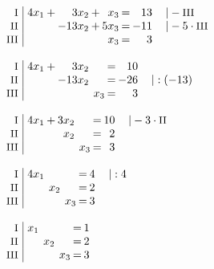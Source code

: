 \begin{equation*}
\begin{array}{l}
\begin{array}{r|rcrcrcrl}
\end{array}
\\ \\
\setlength{\arraycolsep}{1pt}
\begin{array}{r|rcrcrcrl}
    \text{\small I } &\; 4x_{1} & + &   3x_{2} & + &  x_{3} & = &  13 & \quad|-\text{\small III}       \\
   \text{\small II } &\;        &   & -13x_{2} & + & 5x_{3} & = & -11 & \quad|-5\cdot\text{\small III} \\
  \text{\small III } &\;        &   &          &   &  x_{3} & = &   3 &                                  
\end{array}
\\ \\
\setlength{\arraycolsep}{1pt}
\begin{array}{r|rcrcrcrl}
    \text{\small I } &\; 4x_{1} & + &   3x_{2} &  &       & = &  10 &              \\
   \text{\small II } &\;        &   & -13x_{2} &  &       & = & -26 & \quad|:(-13) \\
  \text{\small III } &\;        &   &          &  & x_{3} & = &   3 &                
\end{array}
\\ \\
\setlength{\arraycolsep}{1pt}
\begin{array}{r|rcrcrcrl}
    \text{\small I } &\; 4x_{1} & + & 3x_{2} &  &       & = & 10 & \quad|-3\cdot\text{\small II} \\
   \text{\small II } &\;        &   &  x_{2} &  &       & = &  2 &                               \\
  \text{\small III } &\;        &   &        &  & x_{3} & = &  3 &                                 
\end{array}
\\ \\
\setlength{\arraycolsep}{1pt}
\begin{array}{r|rcrcrcrl}
    \text{\small I } &\; 4x_{1} &  &       &  &       & = & 4 & \quad|:4 \\
   \text{\small II } &\;        &  & x_{2} &  &       & = & 2 &          \\
  \text{\small III } &\;        &  &       &  & x_{3} & = & 3 &            
\end{array}
\\ \\
\setlength{\arraycolsep}{1pt}
\begin{array}{r|rcrcrcrl}
    \text{\small I } &\; x_{1} &  &       &  &       & = & 1 & \\
   \text{\small II } &\;       &  & x_{2} &  &       & = & 2 & \\
  \text{\small III } &\;       &  &       &  & x_{3} & = & 3 &   
\end{array}
\end{array}
\end{equation*}

